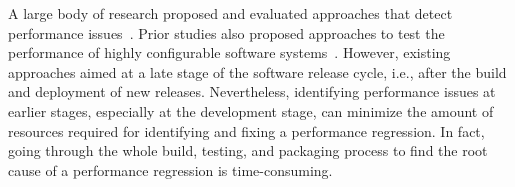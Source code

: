 A large body of research proposed and evaluated approaches that detect performance issues~\cite{Nguyen:2012:ADP,nguyen2011automated,Nguyen:2014:ICS,foo2010mining,DBLP:conf/icse/FooJAHZF15}. Prior studies also proposed approaches to test the performance of highly configurable software systems~\cite{DBLP:journals/dt/SaxenaFHMYM00,wu2010performance,DBLP:journals/ese/HalinNADPB19}. However, existing approaches aimed at a late stage of the software release cycle, i.e., after the build and deployment of new releases. Nevertheless, identifying performance issues at earlier stages, especially at the development stage, can minimize the amount of resources required for identifying and fixing a performance regression. In fact, going through the whole build, testing, and packaging process to find the root cause of a performance regression is time-consuming. %


